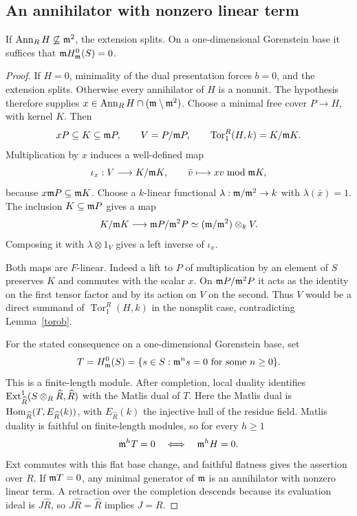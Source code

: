 \subsection{An annihilator with nonzero linear term}
\begin{theorem}\label{linear-ann}
If $\operatorname{Ann}_R H\not\subseteq\mathfrak m^2$, the extension splits.
On a one-dimensional Gorenstein base it suffices that $\mathfrak m H^0_{\mathfrak m}(S)=0$.
\end{theorem}
\begin{proof}
If $H=0$, minimality of the dual presentation forces $b=0$, and the
extension splits. Otherwise every annihilator of $H$ is a nonunit.
The hypothesis therefore supplies
$x\in\operatorname{Ann}_R H\cap(\mathfrak m\setminus\mathfrak m^2)$.
Choose a minimal free cover $P\to H$, with kernel $K$.  Then
\[
 xP\subseteq K\subseteq\mathfrak m P,
 \qquad V=P/\mathfrak m P,
 \qquad \operatorname{Tor}_1^R(H,k)=K/\mathfrak m K.
\]
Multiplication by $x$ induces a well-defined map
\[
 \iota_x:V\longrightarrow K/\mathfrak m K,
 \qquad \bar v\longmapsto xv\bmod\mathfrak m K,
\]
because $x\mathfrak m P\subseteq\mathfrak m K$.  Choose a $k$-linear functional
$\lambda:\mathfrak m/\mathfrak m^2\to k$ with $\lambda(\bar x)=1$.
The inclusion $K\subseteq\mathfrak m P$ gives a map
\[
 K/\mathfrak m K\longrightarrow\mathfrak m P/\mathfrak m^2P
       \simeq(\mathfrak m/\mathfrak m^2)\otimes_k V.
\]
Composing it with $\lambda\otimes1_V$ gives a left inverse of
$\iota_x$.

Both maps are $F$-linear.  Indeed a lift to $P$ of multiplication
by an element of $S$ preserves $K$ and commutes with the scalar $x$. On $\mathfrak m P/\mathfrak m^2P$ it acts as the identity on the first tensor factor
and by its action on $V$ on the second.  Thus $V$ would be a direct
summand of $\operatorname{Tor}_1^R(H,k)$ in the nonsplit case,
contradicting Lemma~\ref{torob}.

For the stated consequence on a one-dimensional Gorenstein base,
set
\[
 T=H^0_{\mathfrak m}(S)
   =\{s\in S:\mathfrak m^n s=0\text{ for some }n\geq0\}.
\]
This is a finite-length module.  After completion, local duality
identifies $\operatorname{Ext}^1_{\widehat R}(S\otimes_R\widehat R,\widehat R)$
with the Matlis dual of $T$.  Here the Matlis dual is
$\operatorname{Hom}_{\widehat R}(T,E_{\widehat R}(k))$, with $E_{\widehat R}(k)$
the injective hull of the residue field.  Matlis duality is faithful
on finite-length modules, so for every $h\geq1$
\begin{equation}\label{torsion-annihilator-equivalence}
 \mathfrak m^hT=0\quad\Longleftrightarrow\quad\mathfrak m^hH=0.
\end{equation}
Ext commutes with this flat base change, and faithful flatness gives
the assertion over $R$.  If $\mathfrak m T=0$, any minimal generator of
$\mathfrak m$ is an annihilator with nonzero linear term.  A retraction over
the completion descends because its evaluation ideal is
$J\widehat R$, so $J\widehat R=\widehat R$ implies $J=R$.
\end{proof}


